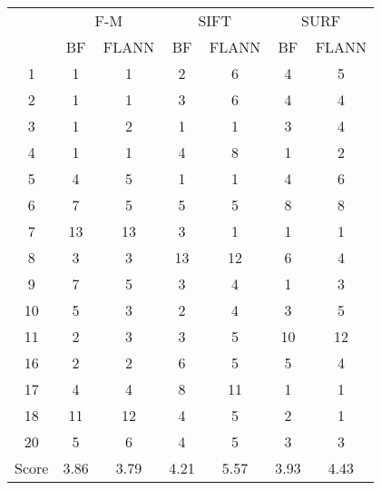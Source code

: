 \documentclass[draft,final]{vutinfth} %
\begin{document}
\begin{appendices}
\begin{minipage}{\linewidth}
\centering
\begin{tabular}{c|cc|cc|cc}
\multirow{2}{*}{ } & \multicolumn{2}{c}{ F-M } & \multicolumn{2}{c}{ SIFT } & \multicolumn{2}{c}{ SURF } \\
& BF & FLANN & BF & FLANN & BF & FLANN \\
\hline
1 & 1 & 1 & 2 & 6 & 4 & 5 \\
2 & 1 & 1 & 3 & 6 & 4 & 4 \\
3 & 1 & 2 & 1 & 1 & 3 & 4 \\
4 & 1 & 1 & 4 & 8 & 1 & 2 \\
5 & 4 & 5 & 1 & 1 & 4 & 6 \\
6 & 7 & 5 & 5 & 5 & 8 & 8 \\
7 & 13 & 13 & 3 & 1 & 1 & 1 \\
8 & 3 & 3 & 13 & 12 & 6 & 4 \\
9 & 7 & 5 & 3 & 4 & 1 & 3 \\
10 & 5 & 3 & 2 & 4 & 3 & 5 \\
11 & 2 & 3 & 3 & 5 & 10 & 12 \\
16 & 2 & 2 & 6 & 5 & 5 & 4 \\
17 & 4 & 4 & 8 & 11 & 1 & 1 \\
18 & 11 & 12 & 4 & 5 & 2 & 1 \\
20 & 5 & 6 & 4 & 5 & 3 & 3 \\
\hline
Score & 3.86 & 3.79 & 4.21 & 5.57 & 3.93 & 4.43 \\
\end{tabular}

 \label{tab:25Mean} 
\end{minipage}



\end{appendices}
\end{document}

